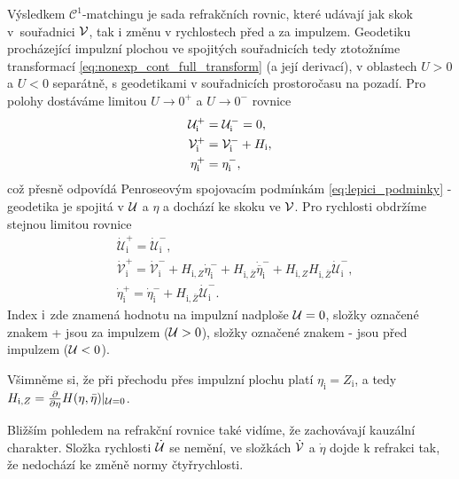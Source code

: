 Výsledkem $\mathcal{C}^1$-matchingu je sada refrakčních rovnic, které udávají jak skok v~souřadnici $\mathcal{V}$,
tak i změnu v rychlostech před a za impulzem. Geodetiku procházející impulzní plochou ve spojitých souřadnicích tedy
ztotožníme transformací \eqref{eq:nonexp_cont_full_transform} (a její derivací), v oblastech $U > 0$ a $U < 0$ separátně, s geodetikami v souřadnicích prostoročasu na pozadí.
Pro polohy dostáváme limitou $U \to 0^+$ a $U \to 0^-$ rovnice
\begin{equation}
    \label{eq:refraction_nonexpanding_positions}
    \begin{split}
        \mathcal{U}^{+}_{\mathrm{i}} &= \mathcal{U}^{-}_{\mathrm{i}} = 0,\\
        \mathcal{V}^{+}_{\mathrm{i}} &= \mathcal{V}^{-}_{\mathrm{i}} + H_{\mathrm{i}},\\
        \eta^{+}_{\mathrm{i}} &= \eta^{-}_{\mathrm{i}},
    \end{split}
\end{equation}
což přesně odpovídá Penroseovým spojovacím podmínkám \eqref{eq:lepici_podminky} - geodetika je spojitá v $\mathcal{U}$ a $\eta$ a dochází ke skoku ve $\mathcal{V}$.
Pro rychlosti obdržíme stejnou limitou rovnice
\begin{equation}
    \label{eq:refraction_nonexpanding_velocities}
    \begin{split}
        &\dot{\mathcal{U}}^{+}_{\mathrm{i}} = \dot{\mathcal{U}}^{-}_{\mathrm{i}},\\
        &\dot{\mathcal{V}}^{+}_{\mathrm{i}} = \dot{\mathcal{V}}_{\mathrm{i}}^{-} + H_{\mathrm{i}, Z}
        \dot{\eta}^{-}_{\mathrm{i}} + H_{\mathrm{i}, \bar{Z}} \dot{\overline{\eta}}^{-}_{\mathrm{i}} + 
        H_{\mathrm{i}, Z} H_{\mathrm{i}, \bar{Z}} \dot{\mathcal{U}}_{\mathrm{i}}^{-},\\
        &\dot{\eta}_{\mathrm{i}}^{+} =\dot{\eta}_{\mathrm{i}}^{-}+H_{\mathrm{i}, \bar{Z}}
        \dot{\mathcal{U}}_{\mathrm{i}}^{-}.
    \end{split}
\end{equation}
Index $\mathrm{i}$ zde znamená hodnotu na impulzní nadploše $\mathcal{U} = 0$, složky označené znakem + jsou za impulzem ($\mathcal{U} > 0$),
složky označené znakem - jsou před impulzem ($\mathcal{U} <0$).

Všimněme si, že při přechodu přes impulzní plochu platí $\eta_{\mathrm{i}} = Z_{\mathrm{i}}$, a tedy $ H_{\mathrm{i},Z} = \frac{\partial}{\partial \eta} H(\eta, \bar{\eta})\vert_{\mathcal{U} = 0}$.

Bližším pohledem na refrakční rovnice také vidíme, že zachovávají kauzální charakter. Složka rychlosti $\dot {\mathcal{U}}$ se
nemění, ve složkách $\dot {\mathcal{V}}$ a $\dot \eta$ dojde k refrakci tak, že nedochází ke změně normy čtyřrychlosti.

